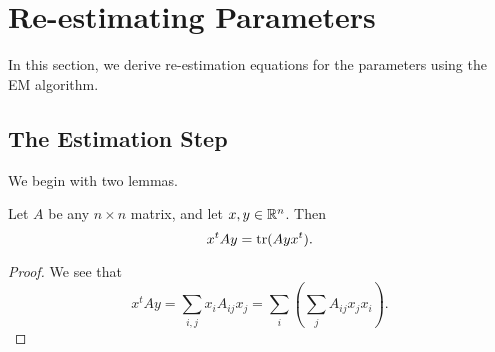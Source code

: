 \documentclass[12pt,leqno]{article}
\begin{document}
\newpage
\section{Re-estimating Parameters}
In this section, we derive re-estimation equations for the parameters using the EM algorithm.
\subsection{The Estimation Step}
We begin with two lemmas.

\begin{Lem}\label{x^tAy}
  Let $A$ be any $n\times{n}$ matrix, and let $x,y\in{\mathbb R}^n$.  Then
  $$
  x^tAy = \text{\rm tr}(Ayx^t).
  $$
\end{Lem}

  \begin{proof}
    We see that
    $$
    x^tAy = \sum_{i,j}x_iA_{ij}x_j = \sum_i\left(\sum_jA_{ij}x_jx_i\right).
    $$
  \end{proof}
  
\end{document}
